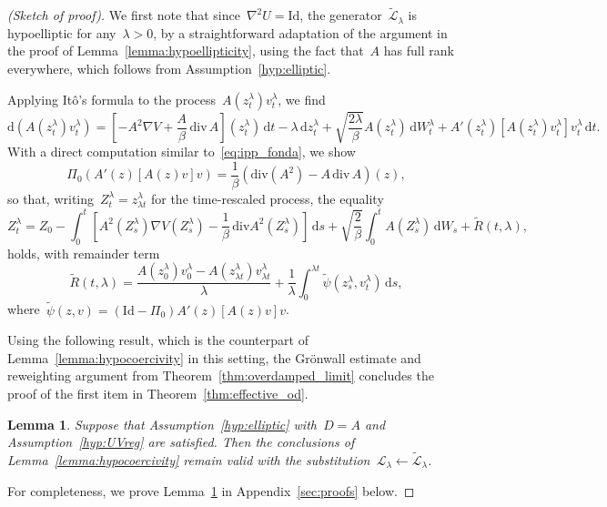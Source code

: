 \documentclass[10pt]{article}
\newcommand{\cL}{\mathcal{L}}
\renewcommand{\d}{\mathrm{d}}
\renewcommand{\div}{\mathrm{div}}
\newcommand{\1}{\mathbbm 1}
\newcommand{\Id}{\mathrm{Id}}
\newtheorem{lemma}{Lemma}
\begin{document}
    \begin{proof}[(Sketch of proof)]
    We first note that since~$\nabla^2 U = \Id$, the generator~$\widetilde{\cL}_\lambda$ is hypoelliptic for any~$\lambda>0$, by a straightforward adaptation of the argument in the proof of Lemma~\ref{lemma:hypoellipticity}, using the fact that~$A$ has full rank everywhere, which follows from Assumption~\ref{hyp:elliptic}.

    Applying It\^o's formula to the process~$A(z_t^\lambda)v_t^\lambda$, we find
    \begin{equation}
        \d\left(A(z_t^\lambda) v_t^\lambda\right) = \left[-A^2\nabla V + \frac{A}\beta\,\div\, A\right](z_t^\lambda)\,\d t - \lambda\,\d z_t^\lambda + \sqrt{\frac{2\lambda}\beta}A(z_t^\lambda)\,\d W_t^\lambda + A'(z_t^\lambda)\left[A(z_t^\lambda)v_t^\lambda\right]v_t^\lambda\,\d t.
    \end{equation}
    With a direct computation similar to~\eqref{eq:ipp_fonda}, we show
    \begin{equation}
        \Pi_0\left(A'(z)\left[A(z)v\right]v\right) = \frac1\beta\left(\div(A^2)-A\,\div\,A\right)(z),
    \end{equation}
    so that, writing~$Z_t^\lambda = z_{\lambda t}^\lambda$ for the time-rescaled process, the equality
    \begin{equation}
        Z_t^\lambda = Z_0 - \int_0^t \left[A^2(Z_s^\lambda)\nabla V(Z_s^\lambda) - \frac1\beta\,\div A^2(Z_s^\lambda)\right]\,\d s + \sqrt{\frac{2}{\beta}}\int_0^t A(Z_s^\lambda)\,\d W_s + \widetilde{R}(t,\lambda),
    \end{equation}
    holds, with remainder term
    \begin{equation}
        \widetilde{R}(t,\lambda) = \frac{A(z_0^\lambda)v_0^\lambda - A(z_{\lambda t}^\lambda)v_{\lambda t}^\lambda}{\lambda} + \frac1\lambda\int_{0}^{\lambda t}\widetilde{\psi}(z_s^\lambda,v_t^\lambda)\,\d s,
    \end{equation}
    where~$\widetilde{\psi}(z,v) = (\Id-\Pi_0)A'(z)[A(z)v]v$.

    Using the following result, which is the counterpart of Lemma~\ref{lemma:hypocoercivity} in this setting, the Gr\"onwall estimate and reweighting argument from Theorem~\ref{thm:overdamped_limit} concludes the proof of the first item in Theorem~\ref{thm:effective_od}.
    \begin{lemma}
        \label{lemma:hypocoercivity_bis}
        Suppose that Assumption~\ref{hyp:elliptic} with~$D=A$ and Assumption~\ref{hyp:UVreg} are satisfied.
        Then the conclusions of Lemma~\ref{lemma:hypocoercivity} remain valid with the substitution~$\cL_\lambda \leftarrow \widetilde{\cL}_\lambda$.
    \end{lemma}
    For completeness, we prove Lemma~\ref{lemma:hypocoercivity_bis} in Appendix~\ref{sec:proofs} below.


\end{proof}
\end{document}
